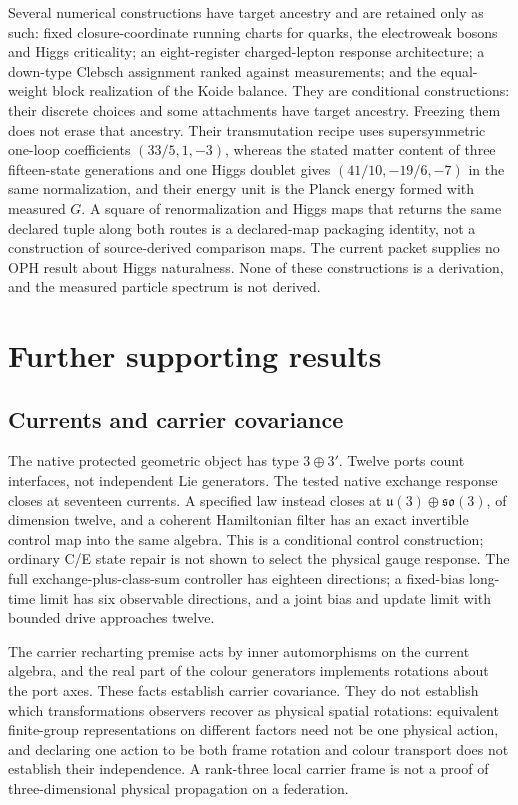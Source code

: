\documentclass[11pt]{article}
\begin{document}
Several numerical constructions have target ancestry and are retained only
as such: fixed closure-coordinate running charts for quarks, the
electroweak bosons and Higgs criticality; an eight-register charged-lepton
response architecture; a down-type Clebsch assignment ranked against
measurements; and the equal-weight block realization of the Koide balance.
They are conditional constructions: their discrete choices and some
attachments have target ancestry. Freezing them does not erase that
ancestry. Their transmutation recipe uses supersymmetric one-loop
coefficients \((33/5,1,-3)\), whereas the stated matter content of three
fifteen-state generations and one Higgs doublet gives \((41/10,-19/6,-7)\)
in the same normalization, and their energy unit is the Planck energy formed
with measured \(G\). A square of renormalization and Higgs maps that returns
the same declared tuple along both routes is a
declared-map packaging identity, not a construction of
source-derived comparison maps.
The current packet supplies no OPH result about Higgs naturalness. None of these
constructions is a derivation, and the measured particle spectrum is not
derived.



\section{Further supporting results}
\label{sec:supporting}

\subsection{Currents and carrier covariance}

The native protected geometric object has type \(3\oplus3'\). Twelve ports
count interfaces, not independent Lie generators. The tested native exchange
response closes at seventeen currents. A specified law instead closes at
\(\mathfrak u(3)\oplus\mathfrak{so}(3)\), of dimension twelve, and a
coherent Hamiltonian filter has an exact invertible control map into the
same algebra. This is a conditional control construction; ordinary C/E state
repair is not shown to select the physical gauge response. The full
exchange-plus-class-sum controller has eighteen directions; a fixed-bias
long-time limit has six observable directions, and a joint bias and update
limit with bounded drive approaches twelve.

The carrier recharting premise acts by inner automorphisms on the current
algebra, and the real part of the colour generators implements rotations
about the port axes. These facts establish carrier covariance. They do not
establish which transformations observers recover as physical spatial
rotations: equivalent finite-group representations on different factors
need not be one physical action, and declaring one action to be both frame
rotation and colour transport does not establish their independence. A
rank-three local carrier frame is not a proof of three-dimensional physical
propagation on a federation.
\end{document}
